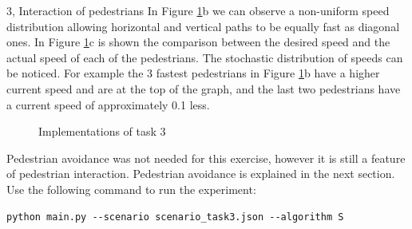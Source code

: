 \documentclass[10pt,a4paper]{article}
\begin{document}
\begin{task}{3, Interaction of pedestrians}
In Figure \ref{sim_task3}b we can observe a non-uniform speed distribution allowing horizontal and vertical paths to be equally fast as diagonal ones. In Figure \ref{sim_task3}c is shown the comparison between the desired speed and the actual speed of each of the pedestrians. The stochastic distribution of speeds can be noticed. For example the 3 fastest pedestrians in Figure \ref{sim_task3}b have a higher current speed and are at the top of the graph, and the last two pedestrians have a current speed of approximately 0.1 less.
\begin{figure}[H] 
\centering
{}
\caption{Implementations of task 3}
\label{sim_task3}
\end{figure}

Pedestrian avoidance was not needed for this exercise, however it is still a feature of pedestrian interaction. Pedestrian avoidance is explained in the next section.
Use the following command to run the experiment:
\begin{verbatim}
python main.py --scenario scenario_task3.json --algorithm S 
\end{verbatim}
\end{task}


\newpage




\end{document}

